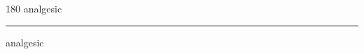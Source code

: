 
\begin{frame}
\begin{center}
\begin{turn}{180}
{\fontsize{2.5cm}{1em}\selectfont analgesic}
\end{turn}
\vspace{1em}\par  
\hrule
\vspace{1em}\par  
{\fontsize{2.5cm}{1em}\selectfont analgesic}
\end{center}
\end{frame}
